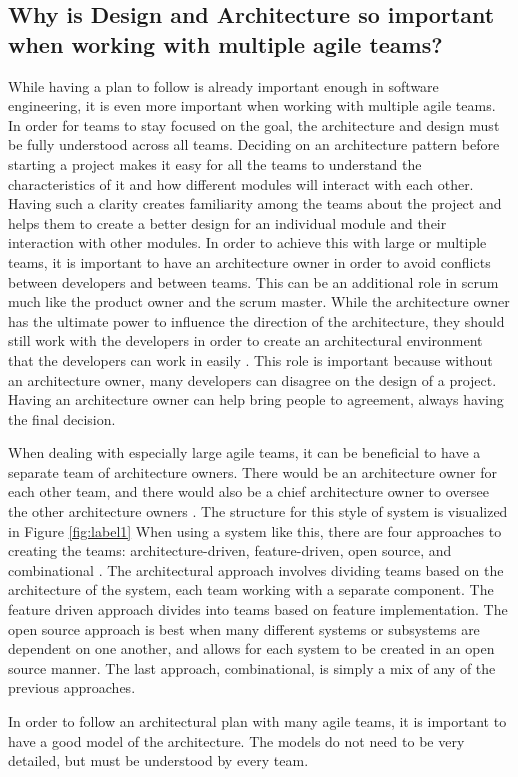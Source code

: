 \documentclass[sigplan,screen]{acmart}
\begin{document}
\subsection{Why is Design and Architecture so important when working with multiple agile teams?}
While having a plan to follow is already important enough in software engineering, it is even more important when working with multiple agile teams. In order for teams to stay focused on the goal, the architecture and design must be fully understood across all teams. Deciding on an architecture pattern before starting a project makes it easy for all the teams to understand the characteristics of it and how different modules will interact with each other. Having such a clarity creates familiarity among the teams about the project and helps them to create a better design for an individual module and their interaction with other modules.
In order to achieve this with large or multiple teams, it is important to have an architecture owner in order to avoid conflicts between developers and between teams. This can be an additional role in scrum much like the product owner and the scrum master. While the architecture owner has the ultimate power to influence the direction of the architecture, they should still work with the developers in order to create an architectural environment that the developers can work in easily \cite{WAmbler}. This role is important because without an architecture owner, many developers can disagree on the design of a project. Having an architecture owner can help bring people to agreement, always having the final decision. \par
When dealing with especially large agile teams, it can be beneficial to have a separate team of architecture owners. There would be an architecture owner for each other team, and there would also be a chief architecture owner to oversee the other architecture owners \cite{WAmbler}. The structure for this style of system is visualized in Figure \ref{fig:label1} When using a system like this, there are four approaches to creating the teams: architecture-driven, feature-driven, open source, and combinational \cite{WAmbler}.
The architectural approach involves dividing teams based on the architecture of the system, each team working with a separate component. The feature driven approach divides into teams based on feature implementation. The open source approach is best when many different systems or subsystems are dependent on one another, and allows for each system to be created in an open source manner. The last approach, combinational, is simply a mix of any of the previous approaches. \par
In order to follow an architectural plan with many agile teams, it is important to have a good model of the architecture. The models do not need to be very detailed, but must be understood by every team.
\end{document}
